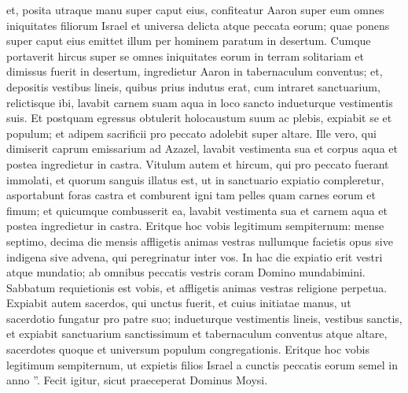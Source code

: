 \begin{biblechapter}
\begin{biblechapter}
\begin{biblechapter}
\begin{biblechapter}
\begin{biblechapter}
\begin{biblechapter}
\begin{biblechapter}
\begin{biblechapter}
\begin{biblechapter}
\begin{biblechapter}
\begin{biblechapter}
\begin{biblechapter}
\begin{biblechapter}
\begin{biblechapter}
\begin{biblechapter}
\begin{biblechapter}
\verse et, posita utraque manu super caput eius, confiteatur Aaron super eum omnes iniquitates filiorum Israel et universa delicta atque peccata eorum; quae ponens super caput eius emittet illum per hominem paratum in desertum.
 \verse Cumque portaverit hircus super se omnes iniquitates eorum in terram solitariam et dimissus fuerit in desertum, 
\verse ingredietur Aaron in tabernaculum conventus; et, depositis vestibus lineis, quibus prius indutus erat, cum intraret sanctuarium, relictisque ibi, 
\verse lavabit carnem suam aqua in loco sancto indueturque vestimentis suis. Et postquam egressus obtulerit holocaustum suum ac plebis, expiabit se et populum; 
\verse et adipem sacrificii pro peccato adolebit super altare. 
\verse Ille vero, qui dimiserit caprum emissarium ad Azazel, lavabit vestimenta sua et corpus aqua et postea ingredietur in castra.
 \verse Vitulum autem et hircum, qui pro peccato fuerant immolati, et quorum sanguis illatus est, ut in sanctuario expiatio compleretur, asportabunt foras castra et comburent igni tam pelles quam carnes eorum et fimum; 
\verse et quicumque combusserit ea, lavabit vestimenta sua et carnem aqua et postea ingredietur in castra.
 \verse Eritque hoc vobis legitimum sempiternum: mense septimo, decima die mensis affligetis animas vestras nullumque facietis opus sive indigena sive advena, qui peregrinatur inter vos. 
\verse In hac die expiatio erit vestri atque mundatio; ab omnibus peccatis vestris coram Domino mundabimini. 
\verse Sabbatum requietionis est vobis, et affligetis animas vestras religione perpetua.
 \verse Expiabit autem sacerdos, qui unctus fuerit, et cuius initiatae manus, ut sacerdotio fungatur pro patre suo; indueturque vestimentis lineis, vestibus sanctis, 
\verse et expiabit sanctuarium sanctissimum et tabernaculum conventus atque altare, sacerdotes quoque et universum populum congregationis. 
\verse Eritque hoc vobis legitimum sempiternum, ut expietis filios Israel a cunctis peccatis eorum semel in anno ”.
 Fecit igitur, sicut praeceperat Dominus Moysi.
 

\end{biblechapter}
\end{biblechapter}
\end{biblechapter}
\end{biblechapter}
\end{biblechapter}
\end{biblechapter}
\end{biblechapter}
\end{biblechapter}
\end{biblechapter}
\end{biblechapter}
\end{biblechapter}
\end{biblechapter}
\end{biblechapter}
\end{biblechapter}
\end{biblechapter}
\end{biblechapter}
